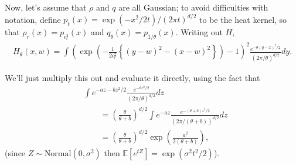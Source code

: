 \documentclass[12pt]{article}
\newcommand{\IE}{\mathbb E}
\begin{document}
Now, let's assume that $\rho$ and $q$ are all Gaussian;
to avoid difficulties with notation,
define  $p_t(x) = \exp(-x^2 / 2t) / (2 \pi t)^{d/2}$
to be the heat kernel,
so that $\rho_r(x) = p_{\epsilon_r^2}(x)$
and $q_\theta(x) = p_{1/\theta}(x)$.
Writing out $H$,
\begin{align}
H_\theta(x, w)
=
\int
    \left(
        \exp\left(
            - \frac{1}{2\epsilon_r^2}
            \left\{
                (y - w)^2 - (x - w)^2
            \right\}
        \right)
        -
        1
    \right)^2
    \frac{
        e^{-\theta(y - x)^2 / 2}
    }{
        (2 \pi / \theta)^{d/2}
    }
dy .
\end{align}

We'll just multiply this out and evaluate it directly,
using the fact that
\begin{align}
&
\int e^{-a z - b z^2 / 2} \frac{e^{-\theta z^2 / 2}}{(2 \pi / \theta)^{d/2}} dz
\\ &\qquad
=
\left(
    \frac{ \theta }{ \theta + b }
\right)^{d/2}
\int e^{-a z} \frac{e^{-(\theta + b) z^2 / 2}}{(2 \pi / (\theta + b))^{d/2}} dz
\\ &\qquad
= \label{eqn:mgf}
\left(
    \frac{ \theta }{ \theta + b }
\right)^{d/2}
\exp\left( \frac{ a^2 }{ 2 (\theta + b) } \right) ,
\end{align}
(since $Z \sim \text{Normal}(0, \sigma^2)$ then $\IE[e^{tZ}] = \exp(\sigma^2 t^2 / 2)$).
\end{document}
